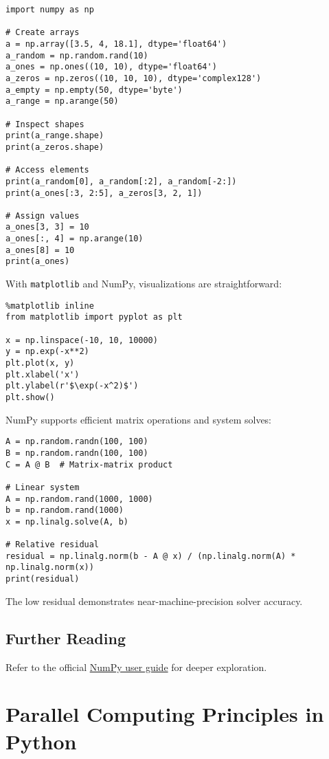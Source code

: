 \documentclass[11pt,a4paper]{book}
\begin{document}
\begin{lstlisting}
import numpy as np

# Create arrays
a = np.array([3.5, 4, 18.1], dtype='float64')
a_random = np.random.rand(10)
a_ones = np.ones((10, 10), dtype='float64')
a_zeros = np.zeros((10, 10, 10), dtype='complex128')
a_empty = np.empty(50, dtype='byte')
a_range = np.arange(50)

# Inspect shapes
print(a_range.shape)
print(a_zeros.shape)

# Access elements
print(a_random[0], a_random[:2], a_random[-2:])
print(a_ones[:3, 2:5], a_zeros[3, 2, 1])

# Assign values
a_ones[3, 3] = 10
a_ones[:, 4] = np.arange(10)
a_ones[8] = 10
print(a_ones)
\end{lstlisting}

With \texttt{matplotlib} and NumPy, visualizations are straightforward:

\begin{lstlisting}
%matplotlib inline
from matplotlib import pyplot as plt

x = np.linspace(-10, 10, 10000)
y = np.exp(-x**2)
plt.plot(x, y)
plt.xlabel('x')
plt.ylabel(r'$\exp(-x^2)$')
plt.show()
\end{lstlisting}

NumPy supports efficient matrix operations and system solves:

\begin{lstlisting}
A = np.random.randn(100, 100)
B = np.random.randn(100, 100)
C = A @ B  # Matrix-matrix product

# Linear system
A = np.random.rand(1000, 1000)
b = np.random.rand(1000)
x = np.linalg.solve(A, b)

# Relative residual
residual = np.linalg.norm(b - A @ x) / (np.linalg.norm(A) * np.linalg.norm(x))
print(residual)
\end{lstlisting}

The low residual demonstrates near-machine-precision solver accuracy.

\section*{Further Reading}
Refer to the official \href{https://numpy.org/user/}{NumPy user guide} for deeper exploration.

\chapter{Parallel Computing Principles in Python}
\end{document}
